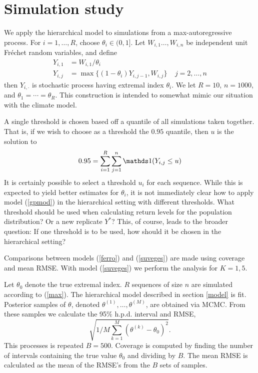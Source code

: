 \section{Simulation study}
\label{sim}

We apply the hierarchical model to simulations from a max-autoregressive process. For $i=1,\ldots,R$, choose $\theta_i\in(0,1]$. Let $W_{i,1}\ldots,W_{i,n}$ be independent unit Fr{\'e}chet random variables, and define
\begin{align}
Y_{i,1} &= W_{i,1}/\theta_i \nonumber \\
Y_{i,j} &= \max\{(1-\theta_i)Y_{i,j-1}, W_{i,j}\}~~~~~j=2,\ldots,n \label{max}
\end{align}
then $Y_{i,\cdot}$ is stochastic process having extremal index $\theta_i$. We let $R=10$, $n=1000$, and $\theta_1=\cdots=\theta_R$. This construction is intended to somewhat mimic our situation with the climate model.

A single threshold is chosen based off a quantile of all simulations taken together. That is, if we wish to choose as a threshold the $0.95$ quantile, then $u$ is the solution to
\[ 0.95 = \sum_{i=1}^R\sum_{j=1}^n\ind(Y_{i,j} \leq u) \]
It is certainly possible to select a threshold $u_i$ for each sequence. While this is expected to yield better estimates for $\theta_i$, it is not immediately clear how to apply model (\ref{gpmod}) in the hierarchical setting with different thresholds. What threshold should be used when calculating return levels for the population distribution? Or a new replicate $Y^*$? This, of course, leads to the broader question: If one threshold is to be used, how should it be chosen in the hierarchical setting?

Comparisons between models (\ref{ferro}) and (\ref{suveges}) are made using coverage and mean RMSE. With model (\ref{suveges}) we perform the analysis for $K=1,5$.

Let $\theta_0$ denote the true extremal index. $R$ sequences of size $n$ are simulated according to (\ref{max}). The hierarchical model described in section \ref{model} is fit. Posterior samples of $\theta$, denoted $\theta^{(1)},\ldots,\theta^{(M)}$, are obtained via MCMC. From these samples we calculate the 95\% h.p.d. interval and RMSE,
\[ \sqrt{1/M \sum_{k=1}^M\left(\theta^{(k)}-\theta_0\right)^2}. \]
This processes is repeated $B=500$. Coverage is computed by finding the number of intervals containing the true value $\theta_0$ and dividing by $B$. The mean RMSE is calculated as the mean of the RMSE's from the $B$ sets of samples.


